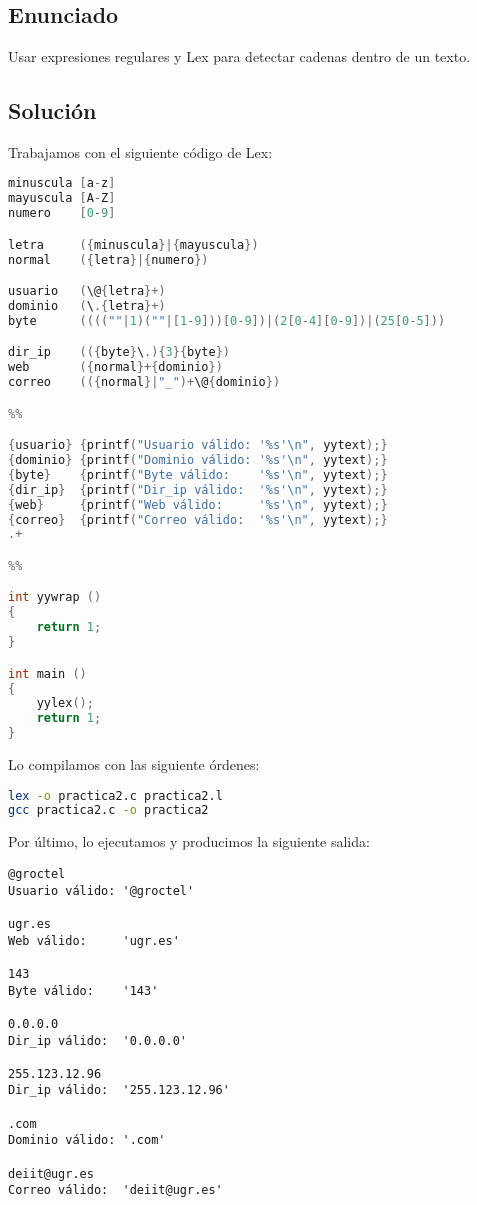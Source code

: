 \chapter{}

\section{Enunciado}

Usar expresiones regulares y Lex para detectar cadenas dentro de un texto.

\section{Solución}

Trabajamos con el siguiente código de Lex:

\begin{lstlisting}[language=c]
minuscula [a-z]
mayuscula [A-Z]
numero    [0-9]

letra     ({minuscula}|{mayuscula})
normal    ({letra}|{numero})

usuario   (\@{letra}+)
dominio   (\.{letra}+)
byte      ((((""|1)(""|[1-9]))[0-9])|(2[0-4][0-9])|(25[0-5]))

dir_ip    (({byte}\.){3}{byte})
web       ({normal}+{dominio})
correo    (({normal}|"_")+\@{dominio})

%%

{usuario} {printf("Usuario válido: '%s'\n", yytext);}
{dominio} {printf("Dominio válido: '%s'\n", yytext);}
{byte}    {printf("Byte válido:    '%s'\n", yytext);}
{dir_ip}  {printf("Dir_ip válido:  '%s'\n", yytext);}
{web}     {printf("Web válido:     '%s'\n", yytext);}
{correo}  {printf("Correo válido:  '%s'\n", yytext);}
.+

%%

int yywrap ()
{
	return 1;
}

int main ()
{
	yylex();
	return 1;
}
\end{lstlisting}

\pagebreak

Lo compilamos con las siguiente órdenes:

\begin{lstlisting}[language=sh]
lex -o practica2.c practica2.l
gcc practica2.c -o practica2
\end{lstlisting}

Por último, lo ejecutamos y producimos la siguiente salida:

\begin{lstlisting}
@groctel
Usuario válido: '@groctel'

ugr.es
Web válido:     'ugr.es'

143
Byte válido:    '143'

0.0.0.0
Dir_ip válido:  '0.0.0.0'

255.123.12.96
Dir_ip válido:  '255.123.12.96'

.com
Dominio válido: '.com'

deiit@ugr.es
Correo válido:  'deiit@ugr.es'
\end{lstlisting}
